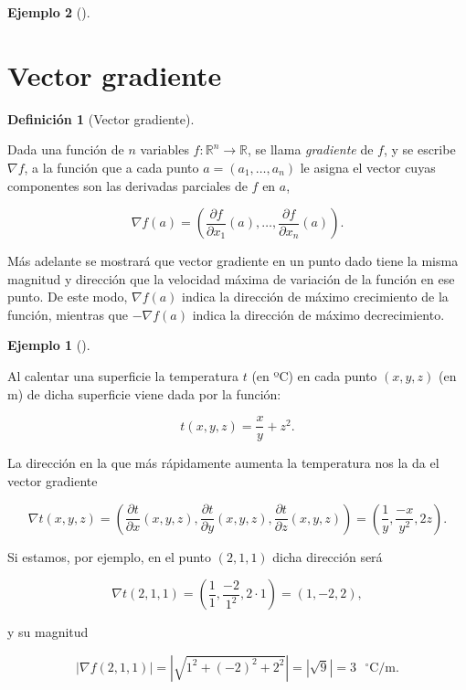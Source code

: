 \documentclass[
  a4paper,
]{scrreport}
\theoremstyle{definition}
\newtheorem{example}{Ejemplo}[chapter]
\theoremstyle{plain}
\theoremstyle{definition}
\newtheorem{definition}{Definición}[chapter]
\theoremstyle{definition}
\theoremstyle{plain}
\theoremstyle{plain}
\theoremstyle{remark}
\begin{document}
\begin{example}[]
\section{Vector gradiente}\label{vector-gradiente}

\begin{definition}[Vector
gradiente]\protect\hypertarget{def-vector-gradiente}{}\label{def-vector-gradiente}

Dada una función de \(n\) variables
\(f:\mathbb{R}^n\rightarrow \mathbb{R}\), se llama \emph{gradiente} de
\(f\), y se escribe \(\nabla f\), a la función que a cada punto
\(a=(a_1,\ldots,a_n)\) le asigna el vector cuyas componentes son las
derivadas parciales de \(f\) en \(a\),

\[\nabla f(a)=\left(\frac{\partial f}{\partial x_1}(a),\ldots,\frac{\partial f}{\partial x_n}(a)\right).\]

\end{definition}

Más adelante se mostrará que vector gradiente en un punto dado tiene la
misma magnitud y dirección que la velocidad máxima de variación de la
función en ese punto. De este modo, \(\nabla f(a)\) indica la dirección
de máximo crecimiento de la función, mientras que \(-\nabla f(a)\)
indica la dirección de máximo decrecimiento.

\begin{example}[]\protect\hypertarget{exm-vector-gradiente}{}\label{exm-vector-gradiente}

Al calentar una superficie la temperatura \(t\) (en ºC) en cada punto
\((x,y,z)\) (en m) de dicha superficie viene dada por la función:

\[
t(x,y,z)=\frac{x}{y}+z^2.
\]

La dirección en la que más rápidamente aumenta la temperatura nos la da
el vector gradiente

\[
\nabla t(x,y,z)=\left(\frac{\partial t}{\partial x}(x,y,z),\frac{\partial t}{\partial y}(x,y,z),\frac{\partial t}{\partial
z}(x,y,z)\right)=\left(\frac{1}{y},\frac{-x}{y^2},2z\right).
\]

Si estamos, por ejemplo, en el punto \((2,1,1)\) dicha dirección será

\[
\nabla t(2,1,1)=\left(\frac{1}{1},\frac{-2}{1^2},2\cdot 1\right)=(1,-2,2),
\]

y su magnitud

\[
|\nabla f(2,1,1)|=|\sqrt{1^2+(-2)^2+2^2}|=|\sqrt{9}|=3 \mbox{ $^\circ$C/m}.
\]

\end{example}


\end{example}
\end{document}
